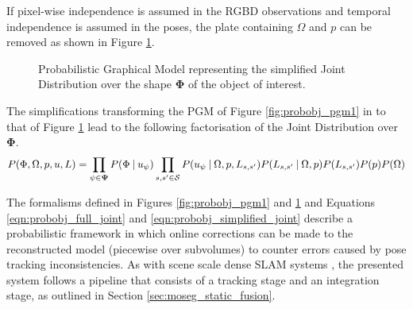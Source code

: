 If pixel-wise independence is assumed in the RGBD observations and temporal
independence is assumed in the poses, the plate containing $\Omega$ and $p$ can
be removed as shown in Figure \ref{fig:probobj_pgm2}.
\begin{figure}[h]
  \label{fig:probobj_pgm2}
  \centering
  \caption[Probabilistic Object Reconstruction Formulation II]
  {Probabilistic Graphical Model representing the simplified Joint
    Distribution over the shape $\mathbf{\Phi}$ of the object of interest.}
\end{figure}

The simplifications transforming the PGM of Figure \ref{fig:probobj_pgm1} in to
that of Figure \ref{fig:probobj_pgm2} lead to the following factorisation of the
Joint Distribution over $\mathbf{\Phi}$.
\begin{equation}
  \label{eqn:probobj_simplified_joint}
  P(\Phi, \Omega, p, u, L) = 
  \prod_{\psi \in \mathbf{\Psi}}P(\Phi \:\vert\: u_{\psi})
  \prod_{s, s' \in \mathcal{S}}P(u_{\psi} \:\vert\: \Omega, p, L_{s, s'})
  P(L_{s, s'} \:\vert\: \Omega, p) P(L_{s, s'})P(p)P(\Omega)
\end{equation}

The formalisms defined in Figures \ref{fig:probobj_pgm1} and
\ref{fig:probobj_pgm2} and Equations \ref{eqn:probobj_full_joint} and
\ref{eqn:probobj_simplified_joint} describe a probabilistic framework in which
online corrections can be made to the reconstructed model (piecewise over
subvolumes) to counter errors caused by pose tracking inconsistencies. As with
scene scale dense SLAM systems \cite{Newcombe2011, Prisacariu2014, NieBner2013},
the presented system follows a pipeline that consists of a tracking stage and an
integration stage, as outlined in Section \ref{sec:moseg_static_fusion}.

